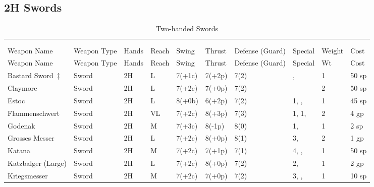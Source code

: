 \documentclass[oneside,11pt,english]{book}
\begin{document}
\subsection{2H Swords}\vspace{-15pt}
\begin{longtabu} to 1\linewidth {X[2,l]XX[-1,c]X[-1,c]XXX[-1,c]X[2,l]X[-3,c]X[-3,r]}
  \captionsetup{labelformat=blank,textformat=empty}
  \caption{Two-handed Swords}\vspace{-15pt}\\
  \label{tab:2H Swords}\\
  Weapon Name						&Weapon Type	&Hands&Reach&Swing&Thrust&Defense (Guard)&Special						&Weight	&Cost\\\toprule\endfirsthead
  Weapon Name					&Weapon Type	&Hands	&Reach	&Swing	&Thrust	&Defense (Guard)	&Special						&Wt		&Cost\\\toprule\endhead
  {Bastard Sword\ \hyperref[wep:bastard-sword-1h]{$ \ddagger $}\label{wep:bastard-sword-2h}}				&Sword			&2H		&L		&7(+1c)	&7(+2p)	&7(2)				&,  			&1		&50 sp\\
  Claymore					&Sword			&2H		&L		&7(+2c)	&7(+0p)	&7(2)	& &2 &50 sp\\
  Estoc						&Sword 			&2H		&L		&8(+0b)	&6(+2p)	&7(2)	& 1, , 			&1		&45 sp\\
  Flammenschwert				&Sword			&2H		&VL		&7(+2c)	&8(+3p)	&7(3)	& 1,  1, 				&2		&4 gp\\
  Godenak &Sword &2H &M &7(+3c) &8(-1p) &8(0) & 1,  &1 &2 sp\\
  Grosses Messer &Sword &2H &L &7(+2c) &8(+0p) &8(1) & 3,  &2 &1 gp\\
  Katana 					&Sword &2H &M 	&7(+2c) &7(+1p) &7(1) & 4, ,  			&1 	&50 sp\\
  Katzbalger (Large) 		&Sword &2H &L 	&7(+2c) &8(+0p) &7(2) & 2,  				&1 	&2 gp \\
  Kriegsmesser 			&Sword &2H &M 	&7(+2c) &7(+0p) &7(2) & 3, ,  			&1 	&10 sp\\

\end{longtabu}
\end{document}
